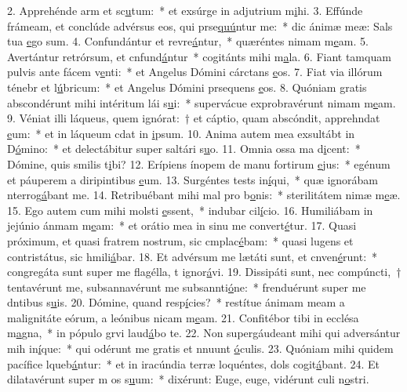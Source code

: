 2. Apprehénde arm et sc\uline{u}tum:~* et exsúrge in adjutrium m\uline{i}hi.
3. Effúnde frámeam, et conclúde advérsus eos, qui prse\uline{quú}ntur me:~* dic ánimæ meæ: Sals tua \uline{e}go sum.
4. Confundántur et revre\uline{á}ntur,~* quæréntes nimam m\uline{e}am.
5. Avertántur retrórsum, et cnfund\uline{á}ntur~* cogitánts mihi m\uline{a}la.
6. Fiant tamquam pulvis ante fácem v\uline{e}nti:~* et Angelus Dómini cárctans \uline{e}os.
7. Fiat via illórum ténebr et l\uline{ú}bricum:~* et Angelus Dómini prsequens \uline{e}os.
8. Quóniam gratis abscondérunt mihi intéritum lái s\uline{u}i:~* supervácue exprobravérunt nimam m\uline{e}am.
9. Véniat illi láqueus, quem ignórat:~† et cáptio, quam abscóndit, apprehndat \uline{e}um:~* et in láqueum cdat in \uline{i}psum.
10. Anima autem mea exsultábt in D\uline{ó}mino:~* et delectábitur super saltári s\uline{u}o.
11. Omnia ossa ma d\uline{i}cent:~* Dómine, quis smilis t\uline{i}bi?
12. Erípiens ínopem de manu fortirum \uline{e}jus:~* egénum et páuperem a diripintibus \uline{e}um.
13. Surgéntes tests in\uline{í}qui,~* quæ ignorábam nterrog\uline{á}bant me.
14. Retribuébant mihi mal pro b\uline{o}nis:~* sterilitátem nimæ m\uline{e}æ.
15. Ego autem cum mihi molsti \uline{e}ssent,~* indubar cil\uline{í}cio.
16. Humiliábam in jejúnio ánmam m\uline{e}am:~* et orátio mea in sinu me convert\uline{é}tur.
17. Quasi próximum, et quasi fratrem nostrum, sic cmplac\uline{é}bam:~* quasi lugens et contristátus, sic hmili\uline{á}bar.
18. Et advérsum me lætáti sunt, et cnven\uline{é}runt:~* congregáta sunt super me flagélla, t ignor\uline{á}vi.
19. Dissipáti sunt, nec compúncti,~† tentavérunt me, subsannavérunt me subsannti\uline{ó}ne:~* frenduérunt super me dntibus s\uline{u}is.
20. Dómine, quand resp\uline{í}cies?~* restítue ánimam meam a malignitáte eórum, a leónibus nicam m\uline{e}am.
21. Confitébor tibi in ecclésa m\uline{a}gna,~* in pópulo grvi laud\uline{á}bo te.
22. Non supergáudeant mihi qui adversántur mih in\uline{í}que:~* qui odérunt me gratis et nnuunt \uline{ó}culis.
23. Quóniam mihi quidem pacífice lqueb\uline{á}ntur:~* et in iracúndia terræ loquéntes, dols cogit\uline{á}bant.
24. Et dilatavérunt super m os s\uline{u}um:~* dixérunt: Euge, euge, vidérunt culi n\uline{o}stri.
